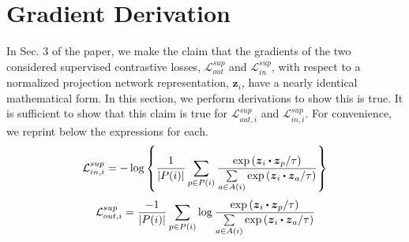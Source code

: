 












\section{Gradient Derivation}
\label{sec:gradient_derivation}
In Sec. 3 of the paper, we make the claim that the gradients of the two considered supervised contrastive losses, $\mathcal{L}_{out}^{sup}$ and $\mathcal{L}_{in}^{sup}$, with respect to a normalized projection network representation, $\boldsymbol{z}_i$, have a nearly identical mathematical form. In this section, we perform derivations to show this is true. It is sufficient to show that this claim is true for $\mathcal{L}_{out,i}^{sup}$ and $\mathcal{L}_{in,i}^{sup}$. For convenience, we reprint below the expressions for each.
\begin{equation}
  \mathcal{L}_{in,i}^{sup}
  =-\log\left\{\frac{1}{|P(i)|}\sum_{p\in P(i)}\frac{\text{exp}\left(\boldsymbol{z}_i\bigcdot\boldsymbol{z}_p/\tau\right)}{\sum\limits_{a\in A(i)}\text{exp}\left(\boldsymbol{z}_i\bigcdot\boldsymbol{z}_a/\tau\right)}\right\}
  \label{eqn:supp_bad_supervised_loss}
\end{equation}
\begin{equation}
  \mathcal{L}_{out,i}^{sup}
  =\frac{-1}{|P(i)|}\sum_{p\in P(i)}\log{\frac{\text{exp}\left(\boldsymbol{z}_i\bigcdot\boldsymbol{z}_p/\tau\right)}{\sum\limits_{a\in A(i)}\text{exp}\left(\boldsymbol{z}_i\bigcdot\boldsymbol{z}_a/\tau\right)}}
  \label{eqn:supp_supervised_loss}
\end{equation}

